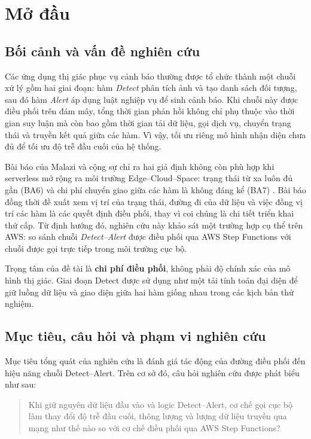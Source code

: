 \section{Mở đầu}

\subsection{Bối cảnh và vấn đề nghiên cứu}

Các ứng dụng thị giác phục vụ cảnh báo thường được tổ chức thành một chuỗi xử lý gồm
hai giai đoạn: hàm \emph{Detect} phân tích ảnh và tạo danh sách đối tượng, sau đó hàm
\emph{Alert} áp dụng luật nghiệp vụ để sinh cảnh báo. Khi chuỗi này được điều phối
trên đám mây, tổng thời gian phản hồi không chỉ phụ thuộc vào thời gian suy luận mà
còn bao gồm thời gian tải dữ liệu, gọi dịch vụ, chuyển trạng thái và truyền kết quả
giữa các hàm. Vì vậy, tối ưu riêng mô hình nhận diện chưa đủ để tối ưu độ trễ đầu
cuối của hệ thống.

Bài báo của Malazi và cộng sự chỉ ra hai giả định không còn phù hợp khi serverless
mở rộng ra môi trường Edge--Cloud--Space: trạng thái từ xa luôn đủ gần (BA6) và chi
phí chuyển giao giữa các hàm là không đáng kể (BA7)
\cite{malazi2026orchestrating}. Bài báo đồng thời đề xuất xem vị trí của trạng thái,
đường đi của dữ liệu và việc đồng vị trí các hàm là các quyết định điều phối, thay vì
coi chúng là chi tiết triển khai thứ cấp. Từ định hướng đó, nghiên cứu này khảo sát
một trường hợp cụ thể trên AWS: so sánh chuỗi \emph{Detect--Alert} được điều phối
qua AWS Step Functions với chuỗi được gọi trực tiếp trong môi trường cục bộ.

Trọng tâm của đề tài là \textbf{chi phí điều phối}, không phải độ chính xác của mô
hình thị giác. Giai đoạn Detect được sử dụng như một tải tính toán đại diện để giữ
luồng dữ liệu và giao diện giữa hai hàm giống nhau trong các kịch bản thử nghiệm.

\subsection{Mục tiêu, câu hỏi và phạm vi nghiên cứu}

Mục tiêu tổng quát của nghiên cứu là đánh giá tác động của đường điều phối đến hiệu
năng chuỗi Detect--Alert. Trên cơ sở đó, câu hỏi nghiên cứu được phát biểu như sau:

\begin{quote}
Khi giữ nguyên dữ liệu đầu vào và logic Detect--Alert, cơ chế gọi cục bộ làm thay
đổi độ trễ đầu cuối, thông lượng và lượng dữ liệu truyền qua mạng như thế nào so
với cơ chế điều phối qua AWS Step Functions?
\end{quote}

